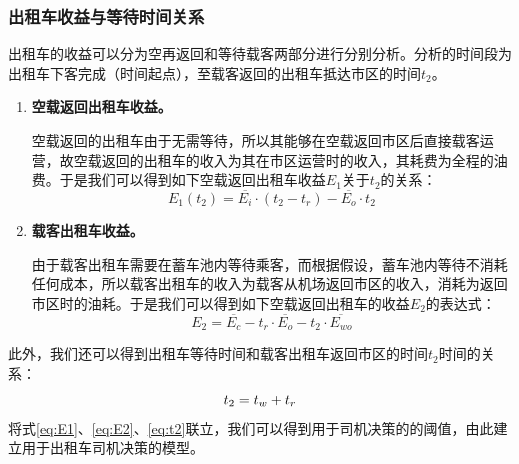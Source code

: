 \documentclass{cumcm}
\begin{document}
\subsubsection{出租车收益与等待时间关系}
出租车的收益可以分为空再返回和等待载客两部分进行分别分析。分析的时间段为出租车下客完成（时间起点），至载客返回的出租车抵达市区的时间$t_2$。
\begin{enumerate}[(1)]
	\item \textbf{空载返回出租车收益。}\par
	空载返回的出租车由于无需等待，所以其能够在空载返回市区后直接载客运营，故空载返回的出租车的收入为其在市区运营时的收入，其耗费为全程的油费。于是我们可以得到如下空载返回出租车收益$E_1$关于$t_2$的关系：
	\begin{equation}
		E_1(t_2)=\overline{E_i}\cdot(t_2-t_r)-\overline{E_o}\cdot t_2
		\label{eq:E1}
	\end{equation}
	\item \textbf{载客出租车收益。}\par
	由于载客出租车需要在蓄车池内等待乘客，而根据假设，蓄车池内等待不消耗任何成本，所以载客出租车的收入为载客从机场返回市区的收入，消耗为返回市区时的油耗。于是我们可以得到如下空载返回出租车的收益$E_2$的表达式：
	\begin{equation}
		E_2=\overline{E_c}-t_r\cdot\overline{E_o}-t_2\cdot\overline{E_{wo}}
		\label{eq:E2}
	\end{equation}
\end{enumerate}
\par
此外，我们还可以得到出租车等待时间\waittime 和载客出租车返回市区的时间$t_2$时间的关系：
\begin{equation}
	t_2=\mbox{$t_w$}+t_r
	\label{eq:t2}
\end{equation}
将式\ref{eq:E1}、\ref{eq:E2}、\ref{eq:t2}联立，我们可以得到用于司机决策的\waittime 的阈值，由此建立用于出租车司机决策的模型。
\end{document}
